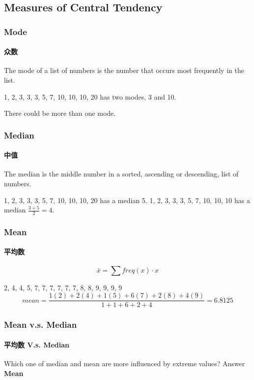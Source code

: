 \documentclass[
	11pt, %
]{beamer}
\begin{document}


\subsection{Measures of Central Tendency}


\begin{frame}
	\frametitle{Mode}
	\framesubtitle{众数}
	\begin{definition}
		The mode of a list of numbers is the number that occurs most frequently
in the list.
	\end{definition}
	\begin{example}
		1, 2, 3, 3, 3, 5, 7, 10, 10, 10, 20 has two modes, 3 and 10.
	\end{example}
	\alert{There could be more than one mode.}
\end{frame}


\begin{frame}
	\frametitle{Median}
	\framesubtitle{中值}
	\begin{definition}
	The median is the middle number in a sorted, ascending or descending, list of numbers.
	\end{definition}
	\begin{example}
		1, 2, 3, 3, 3, 5, 7, 10, 10, 10, 20 has a median 5.
		1, 2, 3, 3, 3, 5, 7, 10, 10, 10 has a median $\frac{3 + 5}{2} = 4$.
	\end{example}
\end{frame}


\begin{frame}
	\frametitle{Mean}
	\framesubtitle{平均数}
	\begin{definition}
	$$\bar{x} =  \sum freq(x) \cdot x$$
	\end{definition}
	\begin{example}
		2, 4, 4, 5, 7, 7, 7, 7, 7, 7, 8, 8, 9, 9, 9, 9\\
		$$mean = \frac{1(2) + 2(4) +  1(5) + 6(7) + 2(8) + 4(9)}{1 + 1 + 6 + 2 + 4} = 6.8125$$
	\end{example}
\end{frame}


\begin{frame}
	\frametitle{Mean v.s. Median}
	\framesubtitle{平均数 V.s. Median}

	{\LARGE Which one of median and mean are more influenced by extreme values?}
	\pause
	\bigskip\bigskip\bigskip\bigskip
	Answer \textbf{Mean}
\end{frame}
\end{document}
